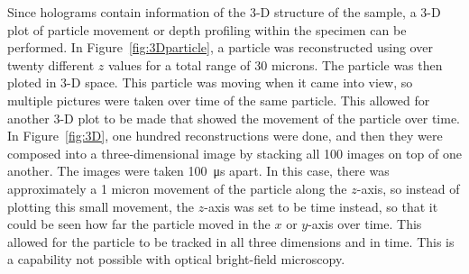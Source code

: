 Since holograms contain information of the 3-D structure of the sample, a 3-D
plot of particle movement or depth profiling within the specimen can be
performed. In Figure~\ref{fig:3Dparticle}, a particle was reconstructed using over
twenty different $z$ values for a total range of 30 microns. The particle was then ploted in 3-D
space. This particle was moving when it came into view, so multiple pictures
were taken over time of the same particle. This allowed for another 3-D plot to
be made that showed the movement of the particle over time.
In Figure~\ref{fig:3D}, one hundred reconstructions were done, and then they
were composed into a three-dimensional image by stacking all 100 images on top
of one another. The images were taken \SI{100}{\micro\second} apart. 
In this case, there was approximately a 1 micron movement 
of the particle along the $z$-axis, so instead of plotting this small movement,
the $z$-axis was set to be time instead, so that it could be seen how far the
particle moved in the $x$ or $y$-axis over time.
This allowed for the
particle to be tracked in all three dimensions and in time. This is a
capability not possible with optical bright-field microscopy.


